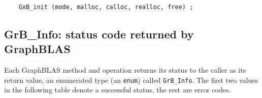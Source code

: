     {\footnotesize
    \begin{verbatim}
    GxB_init (mode, malloc, calloc, realloc, free) ; \end{verbatim}}

\subsection{{\sf GrB\_Info:} status code returned by GraphBLAS} %
\label{info}

Each GraphBLAS method and operation returns its status to the caller as its
return value, an enumerated type (an \verb'enum') called \verb'GrB_Info'.  The
first two values in the following table denote a successful status, the rest
are error codes.

